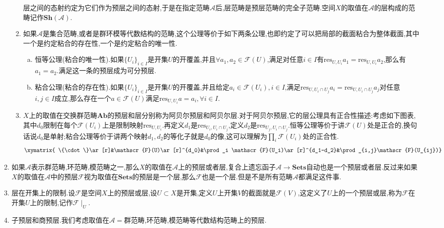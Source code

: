 \begin{enumerate}
\begin{enumerate}[(1)]
		层之间的态射约定为它们作为预层之间的态射,于是在指定范畴$\mathscr{A}$后,层范畴是预层范畴的完全子范畴.空间$X$的取值在$\mathscr{A}$的层构成的范畴记作$\textbf{Sh}(\mathscr{A})$.
		\item 如果$\mathscr{A}$是集合范畴,或者是群环模等代数结构的范畴,这个公理等价于如下两条公理,也即约定了可以把局部的截面粘合为整体截面,其中一个是约定粘合的存在性,一个是约定粘合的唯一性.
		\begin{enumerate}[(a)]
			\item 恒等公理(粘合的唯一性).如果$\{U_i\}_{i\in I}$是开集$U$的开覆盖,并且$\forall a_1,a_2\in\mathscr{F}(U)$,满足对任意$i\in I$有$\mathrm{res}_{U,U_i}a_1=\mathrm{res}_{U,U_i}a_2$,那么有$a_1=a_2$.满足这一条的预层成为可分预层.
			\item 粘合公理(粘合的存在性).如果$\{U_i\}_{i\in I}$是开集$U$的开覆盖,并且给定$a_i\in\mathscr{F}(U_i),i\in I$,满足$\mathrm{res}_{U,U_i\cap U_j}a_i=\mathrm{res}_{U,U_i\cap U_j}a_j$对任意$i,j\in I$成立,那么存在一个$a\in \mathscr{F}(U)$满足$\mathrm{res}_{U,U_i}a=a_i,\forall i\in I$.
		\end{enumerate}
		\item $X$上的取值在交换群范畴$\textbf{Ab}$的预层和层分别称为阿贝尔预层和阿贝尔层.对于阿贝尔预层,它的层公理具有正合性描述:考虑如下图表,其中$d_0$限制在每个$\mathscr{F}(U_i)$上是限制映射$\mathrm{res}_{U,U_i}$.再定义$d_1$是$\mathrm{res}_{U_i,U_i\cap U_j}$,定义$d_2$是$\mathrm{res}_{U_j,U_i\cap U_j}$.恒等公理等价于讲$\mathscr{F}(U)$处是正合的,换句话说$d_0$是单射;粘合公理等价于讲两个映射$d_1,d_2$的等化子就是$d_0$的像,这可以理解为$\prod_i\mathscr{F}(U_i)$处的正合性.
		$$\xymatrix{
			\{\cdot\}\ar[r]&\mathscr{F}(U)\ar[r]^{d_0}&\prod_i \mathscr{F}(U_i)\ar[r]^{d_1-d_2}&\prod_{i,j}\mathscr{F}(U_{ij})}$$
	\end{enumerate}
	\item 如果$\mathscr{A}$表示群范畴,环范畴,模范畴之一,那么$X$的取值在$\mathscr{A}$上的预层或者层,复合上遗忘函子$\mathscr{A}\to\textbf{Sets}$自动也是一个预层或者层.反过来如果$X$的取值在$\mathscr{A}$中的预层$\mathscr{F}$视为取值在$\textbf{Sets}$的预层是一个层,那么$\mathscr{F}$也是一个层.但是不是所有范畴$\mathscr{A}$都满足这件事.
	\item 层在开集上的限制.设$\mathscr{F}$是空间$X$上的预层或层,设$U\subset X$是开集,定义$U$上开集$V$的截面就是$\mathscr{F}(V)$,这定义了$U$上的一个预层或层,称为$\mathscr{F}$在开集$U$上的限制,记作$\mathscr{F}\mid_U$.
	\item 子预层和商预层.我们考虑取值在$\mathscr{A}=$群范畴,环范畴,模范畴等代数结构范畴上的预层.
	\begin{enumerate}

\end{enumerate}
\end{enumerate}
